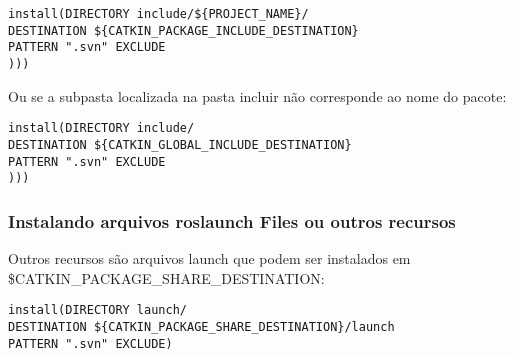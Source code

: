 \begin{verbatim}
install(DIRECTORY include/${PROJECT_NAME}/
DESTINATION ${CATKIN_PACKAGE_INCLUDE_DESTINATION}
PATTERN ".svn" EXCLUDE
)))\end{verbatim}

Ou se a subpasta localizada na pasta incluir não corresponde ao nome do pacote:

\begin{verbatim}
install(DIRECTORY include/
DESTINATION ${CATKIN_GLOBAL_INCLUDE_DESTINATION}
PATTERN ".svn" EXCLUDE
)))\end{verbatim}

\subsubsection{Instalando arquivos roslaunch Files ou outros recursos}

Outros recursos são arquivos launch que podem ser instalados em \${CATKIN\_PACKAGE\_SHARE\_DESTINATION}:

\begin{verbatim}
install(DIRECTORY launch/
DESTINATION ${CATKIN_PACKAGE_SHARE_DESTINATION}/launch
PATTERN ".svn" EXCLUDE)
\end{verbatim}
